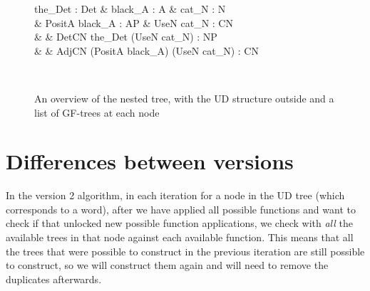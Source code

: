 \begin{figure}
    \centering
    \setlength{\unitlength}{0.2mm}
    \begin{dependency}
        \begin{deptext}[column sep=0.4cm]
              the\_Det : Det \& black\_A : A \& cat\_N : N \\
            \& PositA black\_A : AP \& UseN cat\_N : CN \\
            \& \& DetCN the\_Det (UseN cat\_N) : NP \\
            \& \& AdjCN (PositA black\_A) (UseN cat\_N) : CN \\
        \end{deptext}
    \end{dependency} \\
    \caption{An overview of the nested tree, with the UD structure outside and a list of GF-trees at each node}
    \label{fig:final_nested_compact}
\end{figure}


\section{Differences between versions}

In the version 2 algorithm, in each iteration for a node in the UD tree (which corresponds to a word), after we have applied all possible functions and want to check if that unlocked new possible function applications, we check with \emph{all} the available trees in that node against each available function. This means that all the trees that were possible to construct in the previous iteration are still possible to construct, so we will construct them again and will need to remove the duplicates afterwards.


